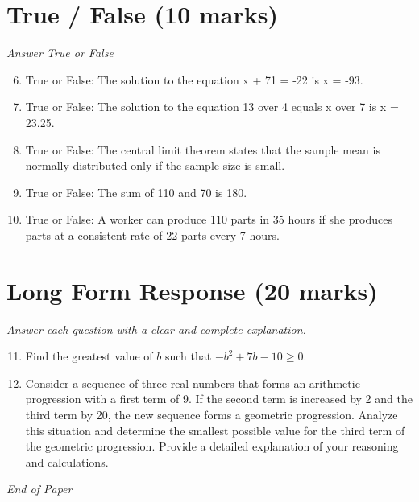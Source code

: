 \documentclass[12pt]{article}
\begin{document}
\section*{True / False (10 marks)}
\textit{Answer True or False}
\begin{enumerate}[label=\arabic*.]
\setcounter{enumi}{5}
\item True or False: The solution to the equation x + 71 = -22 is x = -93.
\item True or False: The solution to the equation 13 over 4 equals x over 7 is x = 23.25.
\item True or False: The central limit theorem states that the sample mean is normally distributed only if the sample size is small.
\item True or False: The sum of 110 and 70 is 180.
\item True or False: A worker can produce 110 parts in 35 hours if she produces parts at a consistent rate of 22 parts every 7 hours.
\end{enumerate}

\section*{Long Form Response (20 marks)}
\textit{Answer each question with a clear and complete explanation.}
\begin{enumerate}[label=\arabic*.]
\setcounter{enumi}{10}
\item Find the greatest value of $b$ such that $-b^2+7 b-10 \ge 0$.
\item Consider a sequence of three real numbers that forms an arithmetic progression with a first term of 9. If the second term is increased by 2 and the third term by 20, the new sequence forms a geometric progression. Analyze this situation and determine the smallest possible value for the third term of the geometric progression. Provide a detailed explanation of your reasoning and calculations.
\end{enumerate}

\vfill
\noindent\textit{End of Paper}
\end{document}
